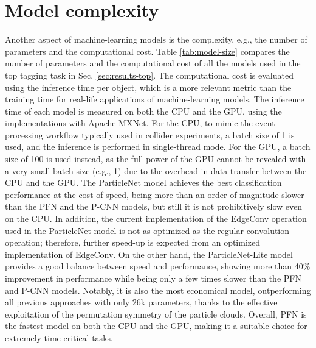 \documentclass[aps,prd,longbibliography,reprint,amsmath,amssymb,amsfonts]{revtex4-1}
\begin{document}
\section{Model complexity}
\label{sec:model-complexity}

Another aspect of machine-learning models is the complexity, e.g., the number of parameters and the computational cost. Table \ref{tab:model-size} compares the number of parameters and the computational cost of all the models used in the top tagging task in Sec. \ref{sec:results-top}. The computational cost is evaluated using the inference time per object, which is a more relevant metric than the training time for real-life applications of machine-learning models. The inference time of each model is measured on both the CPU and the GPU, using the implementations with Apache MXNet. For the CPU, to mimic the  event processing workflow typically used in collider experiments, a batch size of 1 is used, and the inference is performed in single-thread mode. For the GPU, a batch size of 100 is used instead, as the full power of the GPU cannot be revealed with a very small batch size (e.g., 1) due to the overhead in data transfer between the CPU and the GPU. The ParticleNet model achieves the best classification performance at the cost of speed, being more than an order of magnitude slower than the PFN and the P-CNN models, but still it is not prohibitively slow even on the CPU. In addition, the current implementation of the EdgeConv operation used in the ParticleNet model is not as optimized as the regular convolution operation; therefore, further speed-up is expected from an optimized implementation of EdgeConv. On the other hand, the ParticleNet-Lite model provides a good balance between speed and performance, showing more than 40\% improvement in performance while being only a few times slower than the PFN and P-CNN models. Notably, it is also the most economical model, outperforming all previous approaches with only 26k parameters, thanks to the effective exploitation of the permutation symmetry of the particle clouds. Overall, PFN is the fastest model on both the CPU and the GPU, making it a suitable choice for extremely time-critical tasks.
\end{document}
